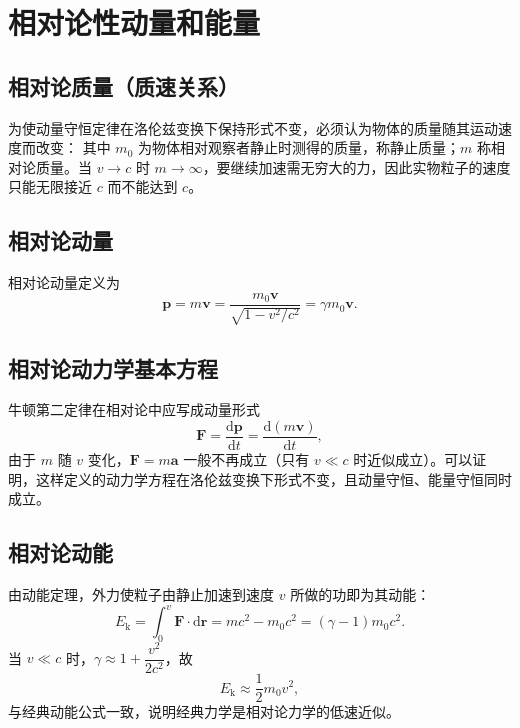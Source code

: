 
\section{相对论性动量和能量}
    \subsection{相对论质量（质速关系）}
    为使动量守恒定律在洛伦兹变换下保持形式不变，必须认为物体的质量随其运动速度而改变：
    其中 $m_0$ 为物体相对观察者静止时测得的质量，称静止质量；$m$ 称相对论质量。当 $v\to c$ 时 $m\to\infty$，要继续加速需无穷大的力，因此实物粒子的速度只能无限接近 $c$ 而不能达到 $c$。

    \subsection{相对论动量}
    相对论动量定义为
    \[
    \boldsymbol{p}=m\boldsymbol{v}=\frac{m_0\boldsymbol{v}}{\sqrt{1-v^{2}/c^{2}}}=\gamma m_0\boldsymbol{v}.
    \]

    \subsection{相对论动力学基本方程}
    牛顿第二定律在相对论中应写成动量形式
    \[
    \boldsymbol{F}=\frac{\mathrm{d}\boldsymbol{p}}{\mathrm{d}t}=\frac{\mathrm{d}(m\boldsymbol{v})}{\mathrm{d}t},
    \]
    由于 $m$ 随 $v$ 变化，$\boldsymbol{F}=m\boldsymbol{a}$ 一般不再成立（只有 $v\ll c$ 时近似成立）。可以证明，这样定义的动力学方程在洛伦兹变换下形式不变，且动量守恒、能量守恒同时成立。

    \subsection{相对论动能}
    由动能定理，外力使粒子由静止加速到速度 $v$ 所做的功即为其动能：
    \[
    E_\mathrm{k}=\int_0^{v}\boldsymbol{F}\cdot\mathrm{d}\boldsymbol{r}=mc^{2}-m_0c^{2}=(\gamma-1)m_0c^{2}.
    \]
    当 $v\ll c$ 时，$\gamma\approx 1+\dfrac{v^{2}}{2c^{2}}$，故
    \[
    E_\mathrm{k}\approx\frac{1}{2}m_0v^{2},
    \]
    与经典动能公式一致，说明经典力学是相对论力学的低速近似。

